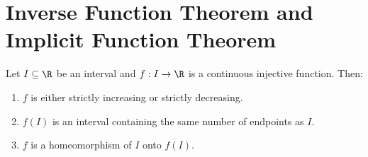 \chapter{Inverse Function Theorem and Implicit Function Theorem}

\begin{theorem}
    Let $I \subseteq \R$ be an interval and $f: I \to \R$ is a continuous injective function. Then:
    \begin{enumerate}
        \item $f$ is either strictly increasing or strictly decreasing.
        \item $f(I)$ is an interval containing the same number of endpoints as $I$.
        \item $f$ is a homeomorphism of $I$ onto $f(I)$.
    \end{enumerate}
\end{theorem}
